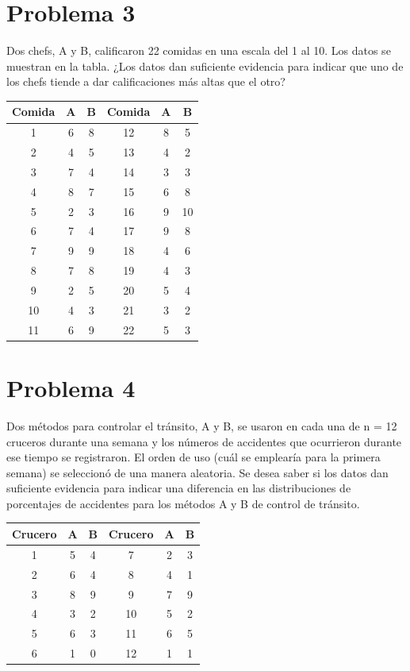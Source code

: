 \documentclass{article}
\begin{document}
\section{Problema 3}

Dos chefs, A y B, calificaron 22 comidas en una escala del 1 al 10. Los datos se muestran en la tabla. ¿Los datos dan suficiente evidencia para indicar que uno de los chefs tiende a dar calificaciones más altas que el otro?
\begin{center}
    \begin{tabular}{c c c| c c c}
        Comida & A & B & Comida & A & B  \\
        \hline
        1      & 6 & 8 & 12     & 8 & 5  \\
        2      & 4 & 5 & 13     & 4 & 2  \\
        3      & 7 & 4 & 14     & 3 & 3  \\
        4      & 8 & 7 & 15     & 6 & 8  \\
        5      & 2 & 3 & 16     & 9 & 10 \\
        6      & 7 & 4 & 17     & 9 & 8  \\
        7      & 9 & 9 & 18     & 4 & 6  \\
        8      & 7 & 8 & 19     & 4 & 3  \\
        9      & 2 & 5 & 20     & 5 & 4  \\
        10     & 4 & 3 & 21     & 3 & 2  \\
        11     & 6 & 9 & 22     & 5 & 3  \\
    \end{tabular}
\end{center}

\section{Problema 4}
Dos métodos para controlar el tránsito, A y B, se usaron en cada una de n = 12 cruceros durante una semana y los números de accidentes que ocurrieron durante ese tiempo se registraron. El orden de uso (cuál se emplearía para la primera semana) se seleccionó de una manera aleatoria. Se desea saber si los datos dan suficiente evidencia para indicar una diferencia en las distribuciones de porcentajes de accidentes para los métodos A y B de control de tránsito.

\begin{center}
    \begin{tabular}{c c c |c c c}
        Crucero & A & B & Crucero & A & B \\
        \hline
        1       & 5 & 4 & 7       & 2 & 3 \\
        2       & 6 & 4 & 8       & 4 & 1 \\
        3       & 8 & 9 & 9       & 7 & 9 \\
        4       & 3 & 2 & 10      & 5 & 2 \\
        5       & 6 & 3 & 11      & 6 & 5 \\
        6       & 1 & 0 & 12      & 1 & 1 \\
    \end{tabular}
\end{center}
\end{document}
